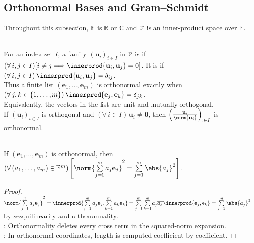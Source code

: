\subsection{Orthonormal Bases and Gram--Schmidt}

Throughout this subsection, $\mathbb{F}$ is $\mathbb{R}$ or $\mathbb{C}$ and $\mathcal{V}$ is an inner-product space over $\mathbb{F}$.

\begin{definition} \label{def:orthogonal-and-orthonormal-sets} \\
For an index set $I$, a family $(\mathbf{u}_i)_{i\in I}$ in $\mathcal{V}$ is  if $(\forall\,i,j\in I)[i\neq j\Longrightarrow\innerprod{\mathbf{u}_i,\mathbf{u}_j}=0]$. It is  if $(\forall\,i,j\in I)\,\innerprod{\mathbf{u}_i,\mathbf{u}_j}=\delta_{ij}$.\\
Thus a finite list $(\mathbf{e}_1,\ldots,\mathbf{e}_m)$ is orthonormal exactly when $(\forall\,j,k\in\{1,\ldots,m\})\,\innerprod{\mathbf{e}_j,\mathbf{e}_k}=\delta_{jk}$.\\
Equivalently, the vectors in the list are unit and mutually orthogonal.\\
If $(\mathbf{u}_i)_{i\in I}$ is orthogonal and $(\forall\,i\in I)\,\mathbf{u}_i\neq\mathbf{0}$, then $\left(\frac{\mathbf{u}_i}{\norm{\mathbf{u}_i}}\right)_{i\in I}$ is orthonormal.
\end{definition}

\begin{proposition} \label{prop:orthonormal-linear-combination-norm} \\
If $(\mathbf{e}_1,\ldots,\mathbf{e}_m)$ is orthonormal, then $(\forall\,(a_1,\ldots,a_m)\in\mathbb{F}^m)\left[\norm{\sum\limits_{j=1}^{m}a_j\mathbf{e}_j}^2=\sum\limits_{j=1}^{m}\abs{a_j}^2\right]$.
\begin{proof}
$\norm{\sum\limits_{j=1}^{m}a_j\mathbf{e}_j}^2=\innerprod{\sum\limits_{j=1}^{m}a_j\mathbf{e}_j,\sum\limits_{k=1}^{m}a_k\mathbf{e}_k}=\sum\limits_{j=1}^{m}\sum\limits_{k=1}^{m}a_j\overline{a_k}\innerprod{\mathbf{e}_j,\mathbf{e}_k}=\sum\limits_{j=1}^{m}\abs{a_j}^2$ by sesquilinearity and orthonormality.\\
: Orthonormality deletes every cross term in the squared-norm expansion.\\
: In orthonormal coordinates, length is computed coefficient-by-coefficient.
\end{proof}
\end{proposition}

